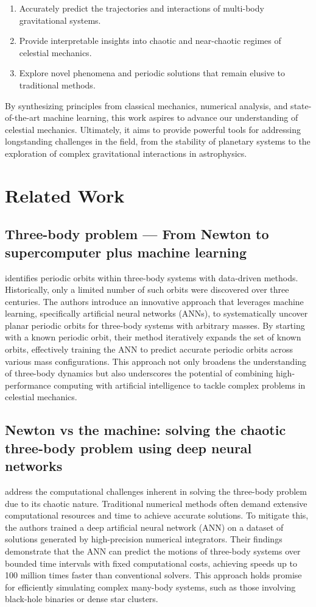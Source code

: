 \documentclass[draft]{agujournal2019}
\begin{document}
\begin{enumerate}
    \item Accurately predict the trajectories and interactions of multi-body gravitational systems.
    \item Provide interpretable insights into chaotic and near-chaotic regimes of celestial mechanics.
    \item Explore novel phenomena and periodic solutions that remain elusive to traditional methods.
\end{enumerate}

By synthesizing principles from classical mechanics, numerical analysis, and state-of-the-art machine learning, this work aspires to advance our understanding of celestial mechanics. Ultimately, it aims to provide powerful tools for addressing longstanding challenges in the field, from the stability of planetary systems to the exploration of complex gravitational interactions in astrophysics.

\section{Related Work}
\subsection{Three-body problem — From Newton to supercomputer plus machine learning}
\cite{Liao_2022} identifies periodic orbits within three-body systems with data-driven methods. Historically, only a limited number of such orbits were discovered over three centuries. The authors introduce an innovative approach that leverages machine learning, specifically artificial neural networks (ANNs), to systematically uncover planar periodic orbits for three-body systems with arbitrary masses. By starting with a known periodic orbit, their method iteratively expands the set of known orbits, effectively training the ANN to predict accurate periodic orbits across various mass configurations. This approach not only broadens the understanding of three-body dynamics but also underscores the potential of combining high-performance computing with artificial intelligence to tackle complex problems in celestial mechanics.
\subsection{Newton vs the machine: solving the chaotic three-body problem using deep neural networks}
\cite{Breen_2020} address the computational challenges inherent in solving the three-body problem due to its chaotic nature. Traditional numerical methods often demand extensive computational resources and time to achieve accurate solutions. To mitigate this, the authors trained a deep artificial neural network (ANN) on a dataset of solutions generated by high-precision numerical integrators. Their findings demonstrate that the ANN can predict the motions of three-body systems over bounded time intervals with fixed computational costs, achieving speeds up to 100 million times faster than conventional solvers. This approach holds promise for efficiently simulating complex many-body systems, such as those involving black-hole binaries or dense star clusters.
\end{document}
